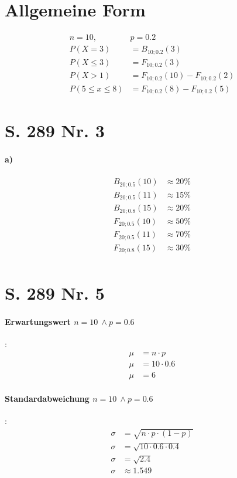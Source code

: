 \documentclass[12pt,a4paper]{report}
\begin{document}
	\section{Allgemeine Form}
	\begin{align*}
		n = 10,\ &p = 0.2 \\
		P(X=3) &= B_{10;0.2}(3) \\
		P(X\leq 3) &= F_{10;0.2}(3) \\
		P(X > 1) &= F_{10;0.2}(10) - F_{10;0.2}(2) \\
		P(5 \leq x \leq 8) &= F_{10;0.2}(8) - F_{10;0.2}(5)
	\end{align*}
	\section{S. 289 Nr. 3}
	\paragraph{a)}
	\begin{align*}
		B_{20;0.5}(10) &\approx 20 \% \\
		B_{20;0.5}(11) &\approx 15 \% \\
		B_{20;0.8}(15) &\approx 20 \% \\
		F_{20;0.5}(10) &\approx 50 \% \\
		F_{20;0.5}(11) &\approx 70 \% \\
		F_{20;0.8}(15) &\approx 30 \% \\
	\end{align*}
	\section{S. 289 Nr. 5}
	\paragraph{Erwartungswert $n=10\ \land p=0.6$}:
	\begin{align*}
		\mu &= n\cdot p \\
		\mu &= 10 \cdot 0.6 \\
		\mu &= 6
	\end{align*}
	\paragraph{Standardabweichung $n=10\ \land p=0.6$}:
	\begin{align*}
		\sigma &= \sqrt{n\cdot p\cdot(1-p)} \\
		\sigma &= \sqrt{10 \cdot 0.6 \cdot 0.4} \\
		\sigma &= \sqrt{2.4} \\
		\sigma &\approx 1.549
	\end{align*}
\end{document}
